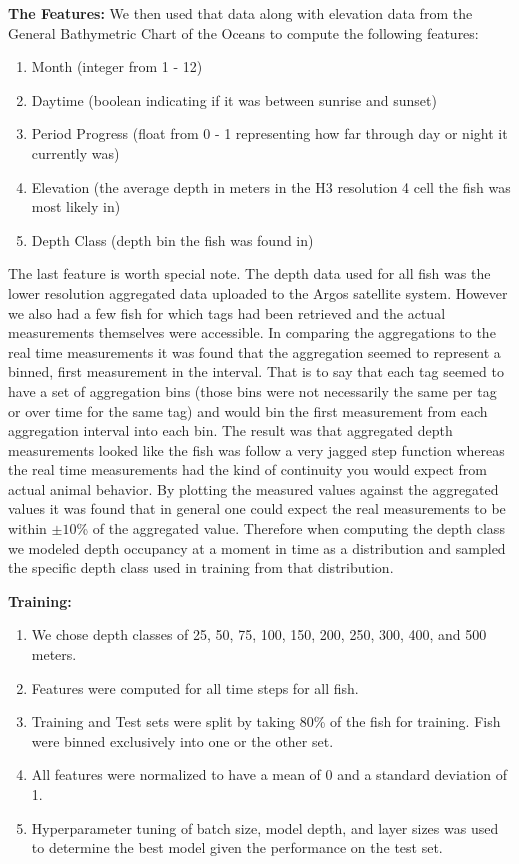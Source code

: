 \documentclass[11pt]{article}
\begin{document}
\textbf{The Features:} We then used that data along with elevation data from the General Bathymetric Chart of the Oceans to compute the following features:

\begin{enumerate}
\item Month (integer from 1 - 12)
\item Daytime (boolean indicating if it was between sunrise and sunset)
\item Period Progress (float from 0 - 1 representing how far through day or night it currently was)
\item Elevation (the average depth in meters in the H3 resolution 4 cell the fish was most likely in) 
\item Depth Class (depth bin the fish was found in)
\end{enumerate}

The last feature is worth special note. The depth data used for all fish was the lower resolution aggregated data uploaded to the Argos satellite system. However we also had a few fish for which tags had been retrieved and the actual measurements themselves were accessible. In comparing the aggregations to the real time measurements it was found that the aggregation seemed to represent a binned, first measurement in the interval. That is to say that each tag seemed to have a set of aggregation bins (those bins were not necessarily the same per tag or over time for the same tag) and would bin the first measurement from each aggregation interval into each bin. The result was that aggregated depth measurements looked like the fish was follow a very jagged step function whereas the real time measurements had the kind of continuity you would expect from actual animal behavior. By plotting the measured values against the aggregated values it was found that in general one could expect the real measurements to be within $\pm10$\% of the aggregated value. Therefore when computing the depth class we modeled depth occupancy at a moment in time as a distribution and sampled the specific depth class used in training from that distribution. \newline

\textbf{Training:}

\begin{enumerate}
\item We chose depth classes of 25, 50, 75, 100, 150, 200, 250, 300, 400, and 500 meters.
\item Features were computed for all time steps for all fish.
\item Training and Test sets were split by taking 80\% of the fish for training. Fish were binned exclusively into one or the other set. 
\item All features were normalized to have a mean of 0 and a standard deviation of 1. 
\item Hyperparameter tuning of batch size, model depth, and layer sizes was used to determine the best model given the performance on the test set. 
\end{enumerate}
\end{document}

